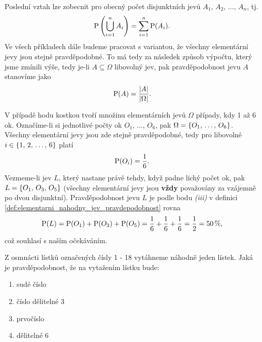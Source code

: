 Poslední vztah lze zobecnit pro obecný počet disjunktních jevů $A_1,\,A_2,\,\dots,\,A_n$, tj.
\[\operatorname{\text{P}}\left(\bigcup\limits_{i=1}^{n}A_i\right)=\sum_{i=1}^{n}\operatorname{\text{P}}(A_i).\]
Ve všech příkladech dále budeme pracovat s variantou, že všechny elementární jevy jsou stejně pravděpodobné. To má tedy za následek způsob výpočtu, který jsme zmínili výše, tedy je-li $A\subseteq\Omega$ libovolný jev, pak pravděpodobnost jevu $A$ stanovíme jako
\[\operatorname{\text{P}}(A)=\dfrac{\left| A \right|}{\left| \Omega \right|}.\]
\begin{example}
    V případě hodu kostkou tvoří množinu elementárních jevů $\Omega$ případy, kdy 1 až 6 ok. Označíme-li si jednotlivé počty ok $O_1,\,\dots,\,O_6$, pak $\Omega=\left\{O_1,\,\dots,\,O_6\right\}$. Všechny elementární jevy jsou zde stejně pravděpodobné, tedy pro libovolné $i\in\left\{1,\,2,\,\dots,\,6\right\}$ platí
    \[\operatorname{\text{P}}(O_i)=\dfrac{1}{6}.\]
    Vezmeme-li jev $L$, který nastane právě tehdy, když padne lichý počet ok, pak $L=\left\{O_1,\,O_3,\,O_5\right\}$ (všechny elementární jevy jsou \textbf{vždy} považovány za vzájemně po dvou disjunktní). Pravděpodobnost jevu $L$ je podle bodu \textit{(iii)} v definici \ref{def:elementarni_nahodny_jev_pravdepodobnost} rovna
    \[\operatorname{\text{P}}(L)=\operatorname{\text{P}}(O_1)+\operatorname{\text{P}}(O_3)+\operatorname{\text{P}}(O_5)=\dfrac{1}{6}+\dfrac{1}{6}+\dfrac{1}{6}=\dfrac{1}{2}=50\,\%,\]
    což souhlasí s naším očekáváním.
\end{example}
\begin{task}
    Z osmnácti lístků označených čísly 1 - 18 vytáhneme náhodně jeden lístek. Jaká je pravděpodobnost, že na vytažením lístku bude:
    \begin{enumerate}[label=(\alph*)]
        \item sudé číslo
        \item číslo dělitelné 3
        \item prvočíslo
        \item dělitelné 6
    \end{enumerate}
    \citep[sekce \emph{Pravděpodobnost a statistika}]{prikladyeu2022}
\end{task}
